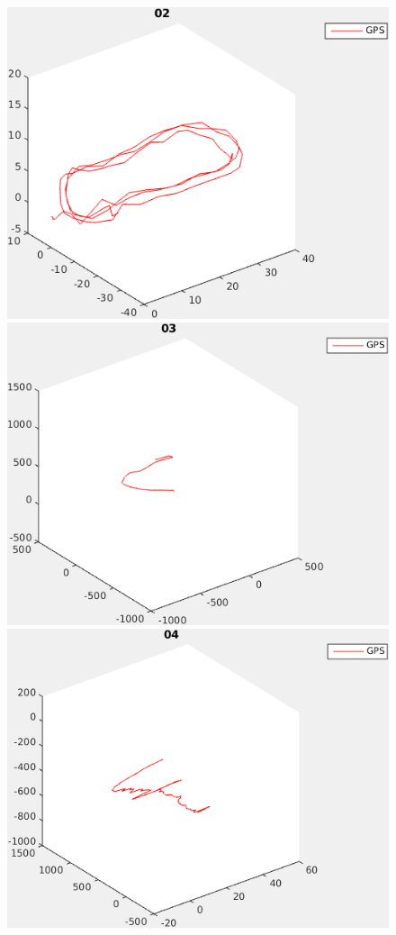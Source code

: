 \documentclass{report}
\begin{document}
\begin{figure}
  \begin{minipage}[b]{.5\textwidth}
    \centering
    \includegraphics[width=.9\textwidth]{02_path}
  \end{minipage}%
  \begin{minipage}[b]{.5\textwidth}
    \centering
    \includegraphics[width=.9\textwidth]{03_path}
  \end{minipage}
  \begin{minipage}[b]{.5\textwidth}
    \centering
    \includegraphics[width=.9\textwidth]{04_path}

\end{minipage}
\end{figure}
\end{document}
